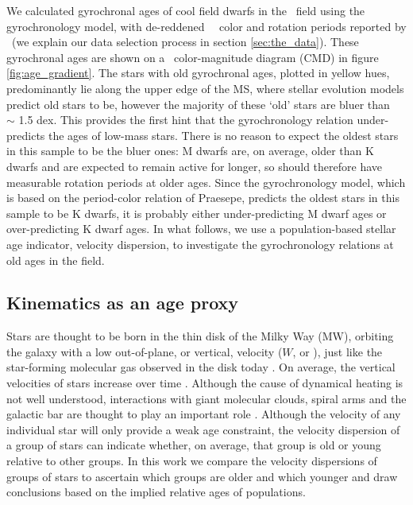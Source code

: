 We calculated gyrochronal ages of cool field dwarfs in the \kepler\ field
using the \citep{angus2019} gyrochronology model, with de-reddened \Gaia\
\gcolor\ color and rotation periods reported by \mct\ (we explain our data
selection process in section \ref{sec:the_data}).
These gyrochronal ages are shown on a \gaia\ color-magnitude diagram (CMD) in
figure \ref{fig:age_gradient}.
The stars with old gyrochronal ages, plotted in yellow hues, predominantly lie
along the upper edge of the MS, where stellar evolution models predict old
stars to be, however the majority of these `old' stars are bluer than \gcolor\
$\sim$ 1.5 dex.
This provides the first hint that the \citet{angus2019} gyrochronology
relation under-predicts the ages of low-mass stars.
There is no reason to expect the oldest stars in this sample to be the bluer
ones: M dwarfs are, on average, older than K dwarfs and are expected to remain
active for longer, so should therefore have measurable rotation periods at
older ages.
Since the \citet{angus2019} gyrochronology model, which is based on the
period-color relation of Praesepe, predicts the oldest stars in this sample to
be K dwarfs, it is probably either under-predicting M dwarf ages or
over-predicting K dwarf ages.
In what follows, we use a population-based stellar age indicator, velocity
dispersion, to investigate the gyrochronology relations at old ages in
the field.

\subsection{Kinematics as an age proxy}

Stars are thought to be born in the thin disk of the Milky Way (MW), orbiting
the galaxy with a low out-of-plane, or vertical, velocity ($W$, or \vz),
just like the star-forming molecular gas observed in the disk today
\citep[\eg][]{stark1989, stark2005, aumer2009, martig2014, aumer2016}.
On average, the vertical velocities of stars increase over time
\citep[\eg][]{nordstrom2004, holmberg2007, holmberg2009, aumer2009,
casagrande2011}.
Although the cause of dynamical heating is not well understood, interactions
with giant molecular clouds, spiral arms and the galactic bar are thought to
play an important role \citep[see][for a review of secular evolution in the
MW]{sellwood2014}.
Although the velocity of any individual star will only provide a weak age
constraint, the velocity dispersion of a group of stars can indicate whether,
on average, that group is old or young relative to other groups.
In this work we compare the velocity dispersions of groups of stars to
ascertain which groups are older and which younger and draw conclusions based
on the implied relative ages of populations.

